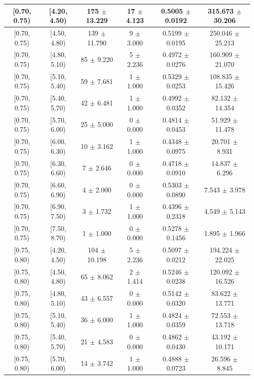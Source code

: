 \begin{longtable}{|c|c|c|c|c|c|}
\hline
[0.70, 0.75) & [4.20, 4.50) & 175 $\pm$ 13.229 & 17 $\pm$ 4.123 & 0.5005 $\pm$ 0.0192 & 315.673 $\pm$ 30.206 \\ 
\hline
[0.70, 0.75) & [4.50, 4.80) & 139 $\pm$ 11.790 & 9 $\pm$ 3.000 & 0.5199 $\pm$ 0.0195 & 250.046 $\pm$ 25.213 \\ 
\hline
[0.70, 0.75) & [4.80, 5.10) & 85 $\pm$ 9.220 & 5 $\pm$ 2.236 & 0.4972 $\pm$ 0.0276 & 160.909 $\pm$ 21.070 \\ 
\hline
[0.70, 0.75) & [5.10, 5.40) & 59 $\pm$ 7.681 & 1 $\pm$ 1.000 & 0.5329 $\pm$ 0.0253 & 108.835 $\pm$ 15.426 \\ 
\hline
[0.70, 0.75) & [5.40, 5.70) & 42 $\pm$ 6.481 & 1 $\pm$ 1.000 & 0.4992 $\pm$ 0.0352 & 82.132 $\pm$ 14.354 \\ 
\hline
[0.70, 0.75) & [5.70, 6.00) & 25 $\pm$ 5.000 & 0 $\pm$ 0.000 & 0.4814 $\pm$ 0.0453 & 51.929 $\pm$ 11.478 \\ 
\hline
[0.70, 0.75) & [6.00, 6.30) & 10 $\pm$ 3.162 & 1 $\pm$ 1.000 & 0.4348 $\pm$ 0.0975 & 20.701 $\pm$ 8.931 \\ 
\hline
[0.70, 0.75) & [6.30, 6.60) & 7 $\pm$ 2.646 & 0 $\pm$ 0.000 & 0.4718 $\pm$ 0.0910 & 14.837 $\pm$ 6.296 \\ 
\hline
[0.70, 0.75) & [6.60, 6.90) & 4 $\pm$ 2.000 & 0 $\pm$ 0.000 & 0.5303 $\pm$ 0.0890 & 7.543 $\pm$ 3.978 \\ 
\hline
[0.70, 0.75) & [6.90, 7.50) & 3 $\pm$ 1.732 & 1 $\pm$ 1.000 & 0.4396 $\pm$ 0.2318 & 4.549 $\pm$ 5.143 \\ 
\hline
[0.70, 0.75) & [7.50, 8.70) & 1 $\pm$ 1.000 & 0 $\pm$ 0.000 & 0.5278 $\pm$ 0.1456 & 1.895 $\pm$ 1.966 \\ 
\hline
[0.75, 0.80) & [4.20, 4.50) & 104 $\pm$ 10.198 & 5 $\pm$ 2.236 & 0.5097 $\pm$ 0.0212 & 194.224 $\pm$ 22.025 \\ 
\hline
[0.75, 0.80) & [4.50, 4.80) & 65 $\pm$ 8.062 & 2 $\pm$ 1.414 & 0.5246 $\pm$ 0.0238 & 120.092 $\pm$ 16.526 \\ 
\hline
[0.75, 0.80) & [4.80, 5.10) & 43 $\pm$ 6.557 & 0 $\pm$ 0.000 & 0.5142 $\pm$ 0.0320 & 83.622 $\pm$ 13.771 \\ 
\hline
[0.75, 0.80) & [5.10, 5.40) & 36 $\pm$ 6.000 & 1 $\pm$ 1.000 & 0.4824 $\pm$ 0.0359 & 72.553 $\pm$ 13.718 \\ 
\hline
[0.75, 0.80) & [5.40, 5.70) & 21 $\pm$ 4.583 & 0 $\pm$ 0.000 & 0.4862 $\pm$ 0.0430 & 43.192 $\pm$ 10.171 \\ 
\hline
[0.75, 0.80) & [5.70, 6.00) & 14 $\pm$ 3.742 & 1 $\pm$ 1.000 & 0.4888 $\pm$ 0.0723 & 26.596 $\pm$ 8.845 \\ 

\end{longtable}

